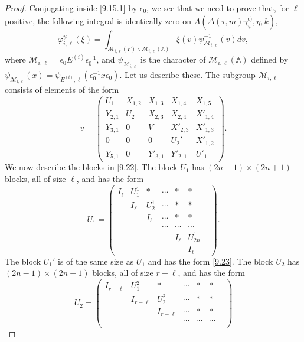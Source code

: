 \documentclass[12pts]{amsart}
\newcommand{\BA}{{\mathbb {A}}}
\begin{document}
\begin{proof}
Conjugating inside \eqref{9.15.1} by $\epsilon_0$, we see that we need to prove that, for $\ell$ positive, the following integral is identically zero on $A(\Delta(\tau,m)\gamma_\psi^{\epsilon)},\eta,k)$,
\begin{equation}\label{9.21}
\varphi_{i,\ell}^\psi(\xi)=
\int_{\mathcal{M}_{i,\ell}(F)\backslash
	\mathcal{M}_{i,\ell}(\BA)}\xi(v)\psi^{-1}_{\mathcal{M}_{i,\ell}}(v)dv, 
\end{equation}
where $\mathcal{M}_{i,\ell}=\epsilon_0E^{(i)}\epsilon_0^{-1}$, and $\psi_{\mathcal{M}_{i,\ell}}$ is the character of $\mathcal{M}_{i,\ell}(\BA)$ defined by $\psi_{\mathcal{M}_{i,\ell}}(x)=\psi_{E^{(i)},\ell}(\epsilon_0^{-1}x\epsilon_0)$. Let us describe these. The subgroup $\mathcal{M}_{i,\ell}$ consists of elements of the form
\begin{equation}\label{9.22}
v=\begin{pmatrix}U_1&X_{1,2}&X_{1,3}&X_{1,4}&X_{1,5}\\Y_{2,1}&U_2&X_{2,3}&X_{2,4}&X'_{1,4}\\
Y_{3,1}&0&V&X'_{2,3}&X'_{1,3}\\0&0&0&U_2'&X'_{1,2}\\Y_{5,1}&0&Y'_{3,1}&Y'_{2,1}&U'_1\end{pmatrix}.
\end{equation}
We now describe the blocks in \eqref{9.22}. The block $U_1$ has $(2n+1)\times (2n+1)$ blocks, all of size $\ell$, and has the form
\begin{equation}\label{9.23}
U_1=\begin{pmatrix}I_\ell&U^1_1&*&\cdots&*&*\\
&I_\ell&U^1_2&\cdots&*&*\\
& &I_\ell&\cdots &* & * \\
& & & \cdots& \cdots&\cdots &\\
& & &       &I_\ell&U^1_{2n}\\
& & &       & &I_\ell\end{pmatrix}.
\end{equation}
The block $U_1'$ is of the same size as $U_1$ and has the form
\eqref{9.23}. The block $U_2$ has $(2n-1)\times (2n-1)$ blocks, all of size $r-\ell$, and has the form
\begin{equation}\label{9.24}
U_2=\begin{pmatrix}I_{r-\ell}&U^2_1&*&\cdots&*&*\\
&I_{r-\ell}&U^2_2&\cdots&*&*\\
& &I_{r-\ell}&\cdots &* & * \\
& & & \cdots& \cdots&\cdots &\\

\end{pmatrix}
\end{equation}
\end{proof}
\end{document}
